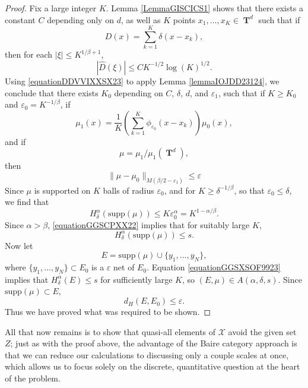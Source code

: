 \documentclass[12pt,reqno]{article}
\numberwithin{equation}{section}
\DeclareMathOperator{\TT}{\mathbf{T}}
\begin{document}
\begin{proof}
    Fix a large integer $K$. Lemma \ref{LemmaGISCICS1} shows that there exists a constant $C$ depending only on $d$, as well as $K$ points $x_1, \dots, x_K \in \TT^d$ such that if
    \[ D(x) = \sum_{k = 1}^K \delta(x - x_k), \]
    then for each $|\xi| \leq K^{1/\beta + 1}$,
    \begin{equation} \label{equationDDVVIXXSX23}
        |\widehat{D}(\xi)| \leq C K^{-1/2} \log(K)^{1/2}.
    \end{equation}
    Using \eqref{equationDDVVIXXSX23} to apply Lemma \ref{lemmaIOJDD23124}, we conclude that there exists $K_0$ depending on $C$, $\delta$, $d$, and $\varepsilon_1$, such that if $K \geq K_0$ and $\varepsilon_0 = K^{-1/\beta}$, if
    \[ \mu_1(x) = \frac{1}{K} \left( \sum_{k = 1}^K \phi_{\varepsilon_0}(x - x_k) \right) \mu_0(x), \]
    and if
    \[ \mu = \mu_1 / \mu_1(\TT^d), \]
    then
    \begin{equation} \label{equationYYUDUSC4434}
        \| \mu - \mu_0 \|_{M(\beta/2 - \varepsilon_1)} \leq \varepsilon
    \end{equation}
    Since $\mu$ is supported on $K$ balls of radius $\varepsilon_0$, and for $K \geq \delta^{-1/\beta}$, so that $\varepsilon_0 \leq \delta$, we find that
    \begin{equation} \label{equationGGSCPXX22}
        H^\alpha_\delta(\text{supp}(\mu)) \leq K \varepsilon_0^\alpha = K^{1 - \alpha/\beta}.
    \end{equation}
    Since $\alpha > \beta$, \eqref{equationGGSCPXX22} implies that for suitably large $K$,
    \begin{equation} \label{equationGGSXSOF9923}
        H^\alpha_\delta(\text{supp}(\mu)) \leq s.
    \end{equation}
    Now let
    \[ E = \text{supp}(\mu) \cup \{ y_1, \dots, y_N \}, \]
    where $\{ y_1, \dots, y_N \} \subset E_0$ is a $\varepsilon$ net of $E_0$. Equation \eqref{equationGGSXSOF9923} implies that $H^\alpha_\delta(E) \leq s$ for sufficiently large $K$, so $(E,\mu) \in A(\alpha,\delta,s)$. Since $\text{supp}(\mu) \subset E$,
    \begin{equation} \label{equationGGISIICV222}
        d_H(E,E_0) \leq \varepsilon.
    \end{equation}
    Thus we have proved what was required to be shown.
\end{proof}

All that now remains is to show that quasi-all elements of $\mathcal{X}$ avoid the given set $Z$; just as with the proof above, the advantage of the Baire category approach is that we can reduce our calculations to discussing only a couple scales at once, which allows us to focus solely on the discrete, quantitative question at the heart of the problem.
\end{document}
